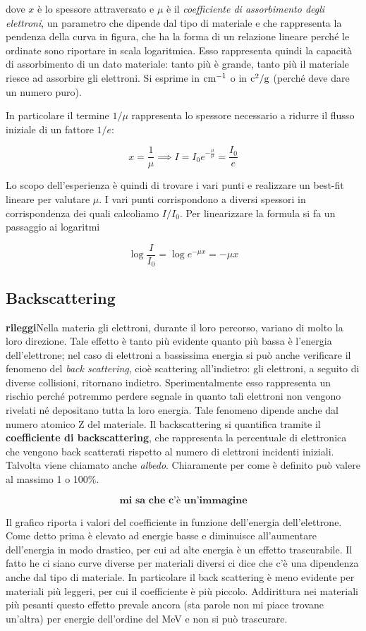 dove $x$ è lo spessore attraversato e $\mu$ è il \textit{coefficiente di assorbimento degli elettroni}, un parametro che dipende dal tipo di materiale e che rappresenta la pendenza della curva in figura, che ha la forma di un relazione lineare perché le ordinate sono riportare in scala logaritmica. Esso rappresenta quindi la capacità di assorbimento di un dato materiale: tanto più è grande, tanto più il materiale riesce ad assorbire gli elettroni. Si esprime in $\rm cm^{-1}$ o in $\rm c^2/g$ (perché deve dare un numero puro).

In particolare il termine $1/\mu$ rappresenta lo spessore necessario a ridurre il flusso iniziale di un fattore $1/e$:

$$x=\frac{1}{\mu}
\implies
I=I_0 e^{-\frac{\mu}{\mu}}
=\frac{I_0}{e}
$$

Lo scopo dell'esperienza è quindi di trovare i vari punti e realizzare un best-fit lineare per valutare $\mu$. I vari punti corrispondono a diversi spessori in corrispondenza dei quali calcoliamo $I/I_0$. Per linearizzare la formula si fa un passaggio ai logaritmi

$$\log{\frac{I}{I_0}}
=\log{e^{-\mu x}}
=-\mu x$$

\subsection{Backscattering}

\textbf{rileggi}Nella materia gli elettroni, durante il loro percorso, variano di molto la loro direzione. Tale effetto è tanto più evidente quanto più bassa è l'energia dell'elettrone; nel caso di elettroni a bassissima energia si può anche verificare il fenomeno del \textit{back scattering}, cioè scattering all'indietro: gli elettroni, a seguito di diverse collisioni, ritornano indietro. Sperimentalmente esso rappresenta un rischio perché potremmo perdere segnale in quanto tali elettroni non vengono rivelati né depositano tutta la loro energia. Tale fenomeno dipende anche dal numero atomico Z del materiale. Il backscattering si quantifica tramite il \textbf{coefficiente di backscattering}, che rappresenta la percentuale di elettronica che vengono back scatterati rispetto al numero di elettroni incidenti iniziali. Talvolta viene chiamato anche \textit{albedo}. Chiaramente per come è definito può valere al massimo 1 o 100\%.

$$\textbf{mi sa che c'è un'immagine}$$

Il grafico riporta i valori del coefficiente in funzione dell'energia dell'elettrone. Come detto prima è elevato ad energie basse e diminuisce all'aumentare dell'energia in modo drastico, per cui ad alte energia è un effetto trascurabile. Il fatto he ci siano curve diverse per materiali diversi ci dice che c'è una dipendenza anche dal tipo di materiale. In particolare il back scattering è meno evidente per materiali più leggeri, per cui il coefficiente è più piccolo. Addirittura nei materiali più pesanti questo effetto prevale ancora (sta parole non mi piace trovane un'altra) per energie dell'ordine del MeV e non si può trascurare.

